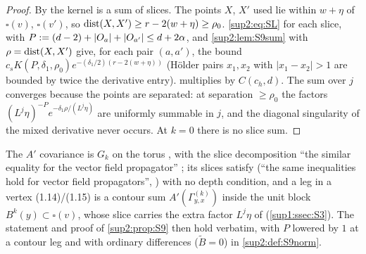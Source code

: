 \begin{proof}
By \cite[(2.6)]{Ba3} the kernel is a sum of slices. The points $X$, $X'$ used lie within $w+\eta$ of $\square(v)$, $\square(v')$, so $\operatorname{dist}(X,X')\ge r-2(w+\eta)\ge\rho_0$. \eqref{sup2:eq:SL} for each slice, with $P:=(d-2)+|O_a|+|O_{a'}|\le d+2\alpha$, and \cref{sup2:lem:S9sum} with $\rho=\operatorname{dist}(X,X')$ give, for each pair $(a,a')$, the bound $c_sK(P,\delta_1,\rho_0)e^{-(\delta_1/2)(r-2(w+\eta))}$ (H\"older pairs $x_1,x_2$ with $|x_1-x_2|>1$ are bounded by twice the derivative entry).  multiplies by $C(c_h,d)$. The sum over $j$ converges because the points are separated: at separation $\ge\rho_0$ the factors $(L^j\eta)^{-P}e^{-\delta_1\rho/(L^j\eta)}$ are uniformly summable in $j$, and the diagonal singularity of the mixed derivative never occurs. At $k=0$ there is no slice sum.
\end{proof}

\begin{proposition}\label{sup2:prop:S9vec}
The $A'$ covariance is $G_k$ on the torus \cite[p.~414]{Ba3}, with the slice decomposition ``the similar equality for the vector field propagator'' \cite[p.~424]{Ba3}; its slices satisfy \cite[(2.10)--(2.11)]{Ba3} (``the same inequalities hold for vector field propagators'', \cite[p.~426]{Ba3}) with no depth condition, and a leg in a vertex (1.14)/(1.15) is a contour sum $A'(\Gamma^{(k)}_{y,x})$ inside the unit block $B^k(y)\subset\square(v)$, whose slice carries the extra factor $L^j\eta$ of \cite[(2.12)]{Ba3} (\cref{sup1:ssec:S3}). The statement and proof of \cref{sup2:prop:S9} then hold verbatim, with $P$ lowered by $1$ at a contour leg and with ordinary differences ($\tilde B=0$) in \cref{sup2:def:S9norm}.
\end{proposition}


